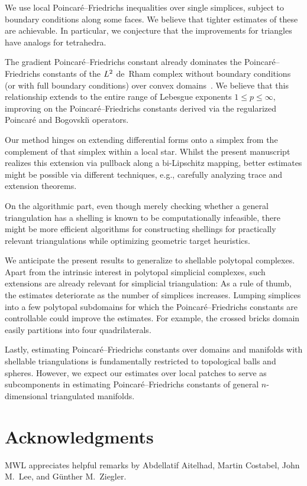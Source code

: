 \documentclass[10pt,a4paper]{article}
\begin{document}
We use local Poincar\'e--Friedrichs inequalities over single simplices, subject to boundary conditions along some faces.
We believe that tighter estimates of these are achievable.
In particular, we conjecture that the improvements for triangles~\cite{laugesen2010minimizing} have analogs for tetrahedra.

The gradient Poincar\'e--Friedrichs constant already dominates the Poincar\'e--Friedrichs constants of the $L^2$ de~Rham complex without boundary conditions (or with full boundary conditions) over convex domains~\cite{guerini2004eigenvalue,licht2024geometry}.
We believe that this relationship extends to the entire range of Lebesgue exponents $1 \leq p \leq \infty$,
improving on the Poincar\'e--Friedrichs constants derived via the regularized Poincar\'e and Bogovski\u{\i} operators.

Our method hinges on extending differential forms onto a simplex from the complement of that simplex within a local star.
Whilst the present manuscript realizes this extension via pullback along a bi-Lipschitz mapping, better estimates might be possible via different techniques, e.g., carefully analyzing trace and extension theorems.

On the algorithmic part, even though merely checking whether a general triangulation has a shelling is known to be computationally infeasible,
there might be more efficient algorithms for constructing shellings for practically relevant triangulations while optimizing geometric target heuristics.

We anticipate the present results to generalize to shellable polytopal complexes.
Apart from the intrinsic interest in polytopal simplicial complexes, such extensions are already relevant for simplicial triangulation:
As a rule of thumb, the estimates deteriorate as the number of simplices increases.
Lumping simplices into a few polytopal subdomains for which the Poincar\'e--Friedrichs constants are controllable could improve the estimates.
For example, the crossed bricks domain easily partitions into four quadrilaterals.

Lastly, estimating Poincar\'e--Friedrichs constants over domains and manifolds with shellable triangulations is fundamentally restricted to topological balls and spheres.
However, we expect our estimates over local patches to serve as subcomponents in estimating Poincar\'e--Friedrichs constants of general $n$-dimensional triangulated manifolds.




\section*{Acknowledgments}
MWL appreciates helpful remarks by Abdellatif Aitelhad, Martin Costabel, John M.\ Lee, and G\"unther M.\ Ziegler.



\end{document}
